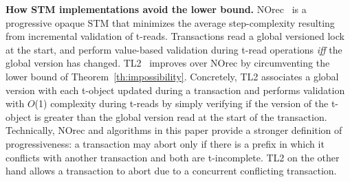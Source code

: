 \vspace{1mm}\noindent\textbf{How STM implementations avoid the lower bound.}
NOrec~\cite{norec} is a progressive opaque STM that minimizes the average step-complexity resulting from incremental 
validation of t-reads. Transactions read a global versioned lock at the start, and perform value-based validation
during t-read operations \emph{iff} the global version has changed.
TL2~\cite{DSS06} improves over NOrec by circumventing the lower bound
of Theorem~\ref{th:impossibility}. Concretely, TL2 associates a global version with each t-object updated during
a transaction and performs validation with $O$(1) complexity during t-reads by simply verifying if the version
of the t-object is greater than the global version read at the start of the transaction. Technically,
NOrec and algorithms in this paper provide a stronger definition of progressiveness: a transaction may abort
only if there is a prefix in which it conflicts with another transaction and both are t-incomplete. TL2 on the other hand allows
a transaction to abort due to a concurrent conflicting transaction.

